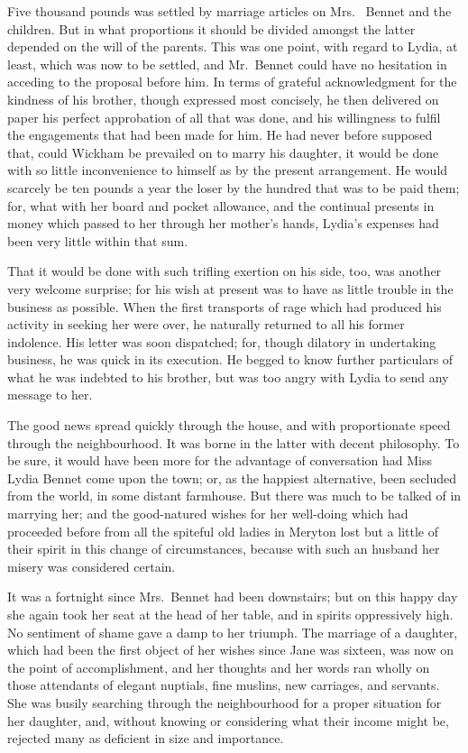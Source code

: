 Five thousand pounds was settled by marriage articles on Mrs.\ %
Bennet and the children.  But in what proportions it should be
divided amongst the latter depended on the will of the parents.
This was one point, with regard to Lydia, at least, which was
now to be settled, and Mr.\ Bennet could have no hesitation in
acceding to the proposal before him.  In terms of grateful
acknowledgment for the kindness of his brother, though
expressed most concisely, he then delivered on paper his perfect
approbation of all that was done, and his willingness to fulfil
the engagements that had been made for him.  He had never before
supposed that, could Wickham be prevailed on to marry his
daughter, it would be done with so little inconvenience to
himself as by the present arrangement.  He would scarcely be
ten pounds a year the loser by the hundred that was to be paid
them; for, what with her board and pocket allowance, and the
continual presents in money which passed to her through her
mother's hands, Lydia's expenses had been very little within
that sum.

That it would be done with such trifling exertion on his side,
too, was another very welcome surprise; for his wish at present
was to have as little trouble in the business as possible.  When
the first transports of rage which had produced his activity in
seeking her were over, he naturally returned to all his former
indolence.  His letter was soon dispatched; for, though dilatory
in undertaking business, he was quick in its execution.  He
begged to know further particulars of what he was indebted to
his brother, but was too angry with Lydia to send any message
to her.

The good news spread quickly through the house, and with
proportionate speed through the neighbourhood.  It was borne
in the latter with decent philosophy.  To be sure, it would
have been more for the advantage of conversation had Miss Lydia
Bennet come upon the town; or, as the happiest alternative,
been secluded from the world, in some distant farmhouse.
But there was much to be talked of in marrying her; and the
good-natured wishes for her well-doing which had proceeded
before from all the spiteful old ladies in Meryton lost but a
little of their spirit in this change of circumstances, because
with such an husband her misery was considered certain.

It was a fortnight since Mrs.\ Bennet had been downstairs; but on
this happy day she again took her seat at the head of her table,
and in spirits oppressively high.  No sentiment of shame gave
a damp to her triumph.  The marriage of a daughter, which had
been the first object of her wishes since Jane was sixteen, was
now on the point of accomplishment, and her thoughts and her
words ran wholly on those attendants of elegant nuptials, fine
muslins, new carriages, and servants.  She was busily searching
through the neighbourhood for a proper situation for her
daughter, and, without knowing or considering what their
income might be, rejected many as deficient in size and
importance.

